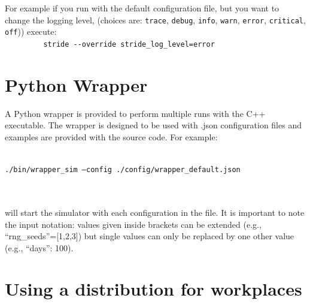 For example if you run with the default configuration file, but you
want to change the logging level,
(choices are: \texttt{trace}, \texttt{debug}, \texttt{info}, \texttt{warn},
\texttt{error}, \texttt{critical}, \texttt{off})) execute:\\
\verb!         stride --override stride_log_level=error!


\section{Python Wrapper}
A Python wrapper is provided to perform multiple runs with the C++ executable.
The wrapper is designed to be used with .json configuration files and examples are provided with the source code.
For example: \\ \\
\centerline{\texttt{./bin/wrapper\_sim --config ./config/wrapper\_default.json}} \\ \\
will start the simulator with each configuration in the file.
It is important to note the input notation: values given inside brackets can be extended (e.g., ``rng\_seeds''=[1,2,3]) but single values can only be replaced by one other value (e.g., ``days'': 100).

\section{Using a distribution for workplaces}	

